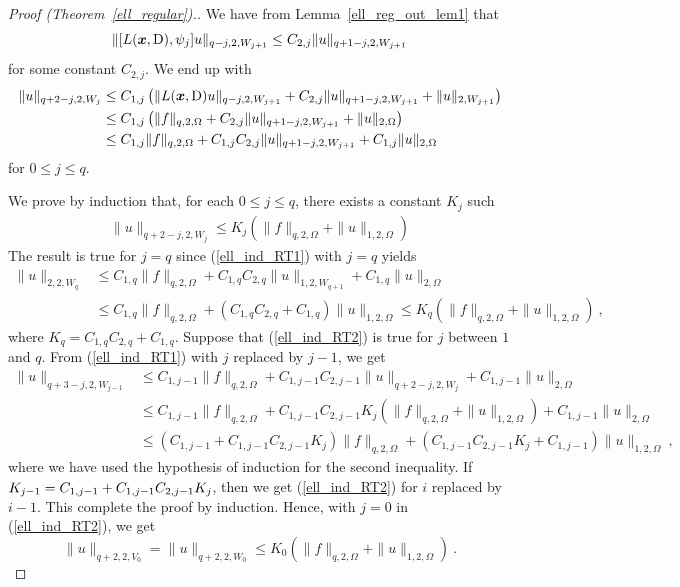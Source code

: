 \begin{proof}[Proof (Theorem~\ref{ell_regular}).]
We have from Lemma~\ref{ell_reg_out_lem1} that
\[
\| [ L({\bm{x}},\operatorname{D}) , \psi_j] u\|_{q-j,2,W_{j+1}}
\leq C_{2,j} \|u\|_{q+1-j,2,W_{j+1}}
\]
for some constant $C_{2,j}$.  We end up with
\begin{align}
\| u \|_{q+2-j,2,W_j} &\leq C_{1,j} \left( \| L({\bm{x}},\operatorname{D}) u\|_{q-j,2,W_{j+1}}
+ C_{2,j} \|u\|_{q+1-j,2,W_{j+1}} + \| u \|_{2,W_{j+1}} \right) \nonumber \\
&\leq C_{1,j} \left( \|f\|_{q,2,\Omega}
+ C_{2,j} \|u\|_{q+1-j,2,W_{j+1}} + \| u \|_{2,\Omega} \right) \nonumber \\
&\leq C_{1,j} \|f\|_{q,2,\Omega}
+ C_{1,j} C_{2,j} \|u\|_{q+1-j,2,W_{j+1}} + C_{1,j} \| u \|_{2,\Omega}
\label{ell_ind_RT1}
\end{align}
for $0\leq j \leq q$.

We prove by induction that, for each $0\leq j \leq q$, there
exists a constant $K_j$ such
\begin{align} \label{ell_ind_RT2}
\|u\|_{q+2-j,2,W_j} \leq K_j \left( \|f\|_{q,2,\Omega} + \|u\|_{1,2,\Omega} \right)
\end{align}
The result is true for $j=q$ since (\ref{ell_ind_RT1}) with $j=q$ yields
\begin{align*}
\| u \|_{2,2,W_q} &\leq C_{1,q} \|f\|_{q,2,\Omega}
+ C_{1,q} C_{2,q} \|u\|_{1,2,W_{q+1}} + C_{1,q} \| u \|_{2,\Omega} \\
&\leq C_{1,q} \|f\|_{q,2,\Omega} + \left( C_{1,q} C_{2,q} + C_{1,q}\right)
\| u \|_{1,2,\Omega}
\leq K_q \left( \|f\|_{q,2,\Omega} + \|u\|_{1,2,\Omega} \right) \ ,
\end{align*}
where $K_q = C_{1,q} C_{2,q} + C_{1,q}$.  Suppose that
(\ref{ell_ind_RT2}) is true for $j$ between $1$ and $q$.  From
(\ref{ell_ind_RT1}) with $j$ replaced by $j-1$, we get
\begin{align*}
\| u \|_{q+3-j,2,W_{j-1}} &\leq C_{1,j-1} \|f\|_{q,2,\Omega}
+ C_{1,j-1} C_{2,j-1} \|u\|_{q+2-j,2,W_j} + C_{1,j-1} \| u \|_{2,\Omega} \\
&\leq C_{1,j-1} \|f\|_{q,2,\Omega}
+ C_{1,j-1} C_{2,j-1} K_j \left( \|f\|_{q,2,\Omega} + \|u\|_{1,2,\Omega} \right)
+ C_{1,j-1} \| u \|_{2,\Omega} \\
&\leq \left( C_{1,j-1} + C_{1,j-1} C_{2,j-1} K_j \right) \|f\|_{q,2,\Omega}
+ \left( C_{1,j-1} C_{2,j-1} K_j + C_{1,j-1} \right)\| u \|_{1,2,\Omega} \ ,
\end{align*}
where we have used the hypothesis of induction for the second
inequality.  If
$\displaystyle K_{j-1} = C_{1,j-1} + C_{1,j-1} C_{2,j-1} K_j$,
then we get (\ref{ell_ind_RT2}) for $i$ replaced by $i-1$.  This complete
the proof by induction.
Hence, with $j=0$ in (\ref{ell_ind_RT2}), we get
\begin{equation} \label{ell_ind_RT3}
\|u\|_{q+2,2,V_0} = \|u\|_{q+2,2,W_0} \leq K_0
\left( \|f\|_{q,2,\Omega} + \|u\|_{1,2,\Omega} \right) \ .
\end{equation}


\end{proof}
